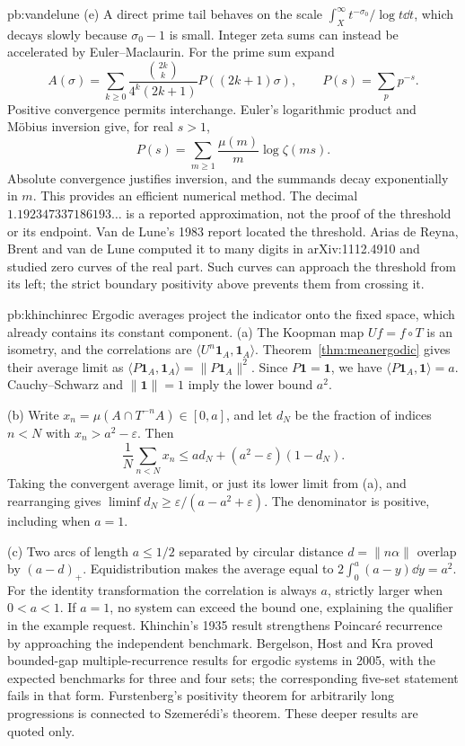 \begin{solution}{pb:vandelune}
(e) A direct prime tail behaves on the scale $\int_X^\infty t^{-\sigma_0}/\log t\dd t$, which decays slowly because $\sigma_0-1$ is small. Integer zeta sums can instead be accelerated by Euler--Maclaurin. For the prime sum expand
\[A(\sigma)=\sum_{k\ge0}\frac{\binom{2k}k}{4^k(2k+1)}P((2k+1)\sigma),\qquad P(s)=\sum_pp^{-s}.
\]
Positive convergence permits interchange. Euler's logarithmic product and Möbius inversion give, for real $s>1$,
\[P(s)=\sum_{m\ge1}\frac{\mu(m)}m\log\zeta(ms).
\]
Absolute convergence justifies inversion, and the summands decay exponentially in $m$. This provides an efficient numerical method. The decimal $1.192347337186193\ldots$ is a reported approximation, not the proof of the threshold or its endpoint.
\leads Van de Lune's 1983 report located the threshold. Arias de Reyna, Brent and van de Lune computed it to many digits in arXiv:1112.4910 and studied zero curves of the real part. Such curves can approach the threshold from its left; the strict boundary positivity above prevents them from crossing it.
\end{solution}
\begin{solution}{pb:khinchinrec}
\idea Ergodic averages project the indicator onto the fixed space, which already contains its constant component.
\writeup (a) The Koopman map $Uf=f\circ T$ is an isometry, and the correlations are $\langle U^n\mathbf1_A,\mathbf1_A\rangle$. Theorem~\ref{thm:meanergodic} gives their average limit as $\langle P\mathbf1_A,\mathbf1_A\rangle=\|P\mathbf1_A\|^2$. Since $P\mathbf1=\mathbf1$, we have $\langle P\mathbf1_A,\mathbf1\rangle=a$. Cauchy--Schwarz and $\|\mathbf1\|=1$ imply the lower bound $a^2$.

(b) Write $x_n=\mu(A\cap T^{-n}A)\in[0,a]$, and let $d_N$ be the fraction of indices $n<N$ with $x_n>a^2-\varepsilon$. Then
\[\frac1N\sum_{n<N}x_n\le ad_N+(a^2-\varepsilon)(1-d_N).
\]
Taking the convergent average limit, or just its lower limit from (a), and rearranging gives $\liminf d_N\ge\varepsilon/(a-a^2+\varepsilon)$. The denominator is positive, including when $a=1$.

(c) Two arcs of length $a\le1/2$ separated by circular distance $d=\|n\alpha\|$ overlap by $(a-d)_+$. Equidistribution makes the average equal to $2\int_0^a(a-y)\dd y=a^2$. For the identity transformation the correlation is always $a$, strictly larger when $0<a<1$. If $a=1$, no system can exceed the bound one, explaining the qualifier in the example request.
\leads Khinchin's 1935 result strengthens Poincar\'e recurrence by approaching the independent benchmark. Bergelson, Host and Kra proved bounded-gap multiple-recurrence results for ergodic systems in 2005, with the expected benchmarks for three and four sets; the corresponding five-set statement fails in that form. Furstenberg's positivity theorem for arbitrarily long progressions is connected to Szemer\'edi's theorem. These deeper results are quoted only.
\end{solution}

